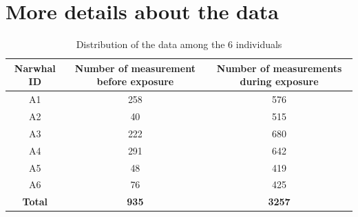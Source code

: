 \documentclass[11pt]{article}
\newcommand {\1}{\mathbb{1}}
\begin{document}
\newpage 

\appendix

\section{More details about the data}


\begin{table}[H]
	\centering
	\begin{tabular}{|c|c|c|}
		\hline
		Narwhal ID & Number of measurement before exposure & Number of measurements during exposure \\
		\hline
		A1 & 258 & 576\\
		\hline
		A2  & 40 & 515 \\
		\hline
		A3 & 222 & 680 \\
		\hline
		A4 & 291 & 642  \\
		\hline
		A5 & 48 & 419\\
		\hline
		A6 & 76 & 425 \\
		\hline
		\textbf{Total} & \textbf{935} & \textbf{3257} \\
		\hline
	\end{tabular}
	\caption{Distribution of the data among the 6 individuals}
	\label{table: data distribution}
\end{table}
\end{document}
